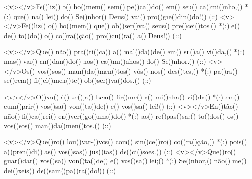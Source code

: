 <v></v>Fe()liz() o() ho()mem() sem() pe()ca()do() em() seu() ca()mi()nho,() *(:)
que() na() lei() do() Se()nhor() Deus() vai() pro()gre()din()do!() (::)
<v></v>Fe()liz() o() ho()mem() que() ob()ser()va() seus() pre()cei()tos,() *(:)
e() de() to()do() o() co()ra()ção() pro()cu()ra() a() Deus!() (::)

<v></v>Que() não() pra()ti()ca() a() mal()da()de() em() su()a() vi()da,() *(:)
mas() vai() an()dan()do() nos() ca()mi()nhos() do() Se()nhor.() (::)
<v></v>Os() vos()sos() man()da()men()tos() vós() nos() des()tes,() *(:)
pa()ra() se()rem() fi()el()men()te() ob()ser()va()dos.() (::)

<v></v>O()xa()lá() se()ja() bem() fir()me() a() mi()nha() vi()da() *(:)
em() cum()prir() vos()sa() von()ta()de() e() vos()sa() lei!() (::)
<v></v>En()tão() não() fi()ca()rei() en()ver()go()nha()do() *(:)
ao() re()pas()sar() to()dos() os() vos()sos() man()da()men()tos.() (::)

<v></v>Que()ro() lou()var-()vos() com() sin()ce()ro() co()ra()ção,() *(:)
pois() a()pren()di() as() vos()sas() jus()tas() de()ci()sões.() (::)
<v></v>Que()ro() guar()dar() vos()sa() von()ta()de() e() vos()sa() lei;() *(:)
Se()nhor,() não() me() dei()xeis() de()sam()pa()ra()do!() (::)